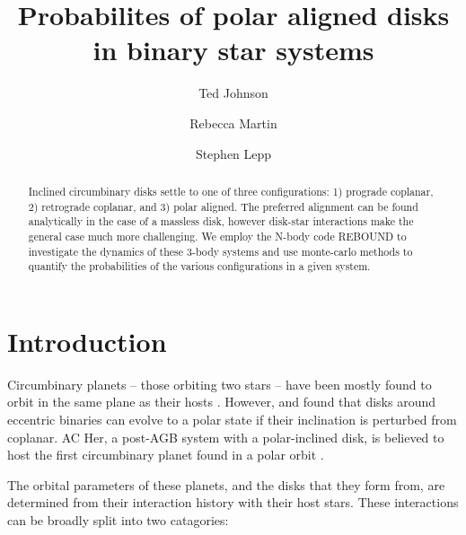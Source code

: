 \documentclass[twocolumn]{aastex631}
\begin{document}
\title{Probabilites of polar aligned disks in binary star systems}

\author{Ted Johnson}
\author{Rebecca Martin}
\author{Stephen Lepp}

\begin{abstract}
    Inclined circumbinary disks settle to one of three configurations: 1) prograde coplanar,
    2) retrograde coplanar, and 3) polar aligned. The preferred alignment can be found analytically
    in the case of a massless disk, however disk-star interactions make the general case much more challenging.
    We employ the N-body code REBOUND to investigate the dynamics of these 3-body systems and use monte-carlo methods
    to quantify the probabilities of the various configurations in a given system.
\end{abstract}

\section{Introduction}
\label{sec:intro}



Circumbinary planets -- those orbiting two stars -- have been mostly found to orbit in the same plane as
their hosts \citep{doyle2011,orosz2012,welsh2012}. However, \citet{aly2015} and \citet{martin2017} found that disks around eccentric binaries
can evolve to a polar state if their inclination is perturbed from coplanar. AC Her, a post-AGB system with a polar-inclined
disk, is believed to host the first circumbinary planet found in a polar orbit \citep{martin2023}.


The orbital parameters of these planets, and the disks that they form from, are determined from their interaction history with their
host stars. These interactions can be broadly split into two catagories:
\end{document}

